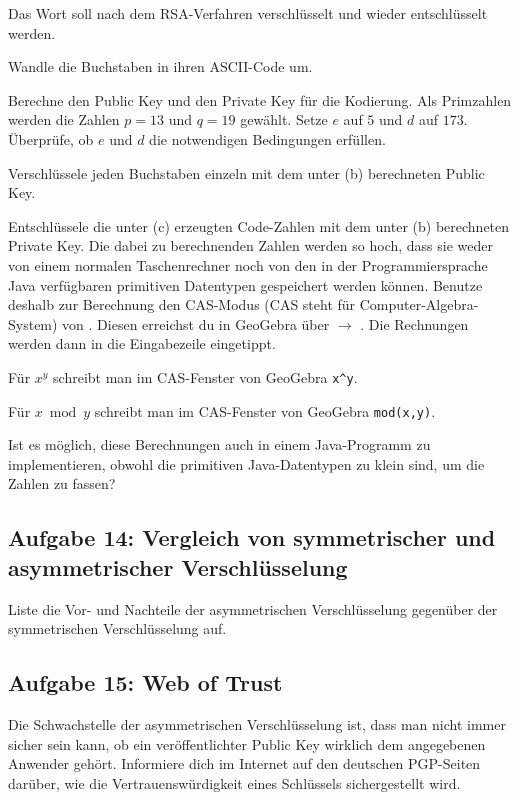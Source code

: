Das Wort  soll nach dem RSA-Verfahren verschlüsselt und
wieder entschlüsselt werden.

\begin{compactenum}[a)]
\item Wandle die Buchstaben in ihren ASCII-Code um. 
\item Berechne den Public Key und den Private Key für die Kodierung. Als
Primzahlen werden die Zahlen $p=13$ und $q=19$ gewählt. Setze $e$ auf $5$ und $d$
auf $173$. Überprüfe, ob $e$ und $d$ die notwendigen Bedingungen erfüllen.
\item Verschlüssele jeden Buchstaben einzeln mit dem unter (b) berechneten Public
Key.
\item Entschlüssele die unter (c) erzeugten Code-Zahlen mit dem unter (b)
berechneten Private Key. Die dabei zu berechnenden Zahlen werden so hoch, dass
sie weder von einem normalen Taschenrechner noch von den in der
Programmiersprache Java verfügbaren primitiven Datentypen gespeichert werden
können. Benutze deshalb zur Berechnung den CAS-Modus (CAS steht für
Computer-Algebra-System) von . Diesen erreichst du in
GeoGebra über  $\rightarrow$ . Die
Rechnungen werden dann in die Eingabezeile eingetippt.

Für $x^y$ schreibt man im CAS-Fenster von GeoGebra \lstinline|x^y|.

Für $x \bmod y$ schreibt man im CAS-Fenster von GeoGebra \lstinline|mod(x,y)|.
\item Ist es möglich, diese Berechnungen auch in einem Java-Programm zu
implementieren, obwohl die primitiven Java-Datentypen zu klein sind, um die
Zahlen zu fassen?
\end{compactenum}


\subsection{Aufgabe 14: Vergleich von symmetrischer und asymmetrischer
Verschlüsselung} 
Liste die Vor- und Nachteile der asymmetrischen Verschlüsselung
gegenüber der symmetrischen Verschlüsselung auf.


\subsection{Aufgabe 15: Web of Trust}

Die Schwachstelle der asymmetrischen Verschlüsselung ist, dass man nicht immer
sicher sein kann, ob ein veröffentlichter Public Key wirklich dem angegebenen
Anwender gehört. Informiere dich im Internet auf den deutschen PGP-Seiten
darüber, wie die Vertrauenswürdigkeit eines Schlüssels sichergestellt wird.
